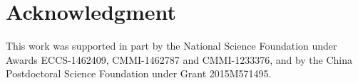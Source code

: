 \documentclass[journal]{IEEEtran}
\begin{document}
%





\section*{Acknowledgment}

This work was supported in part by the National Science Foundation under Awards ECCS-1462409, CMMI-1462787 and CMMI-1233376, and by the China Postdoctoral Science Foundation under Grant 2015M571495. 



\ifCLASSOPTIONcaptionsoff
  \newpage
\fi





%
%
%
\end{document}
